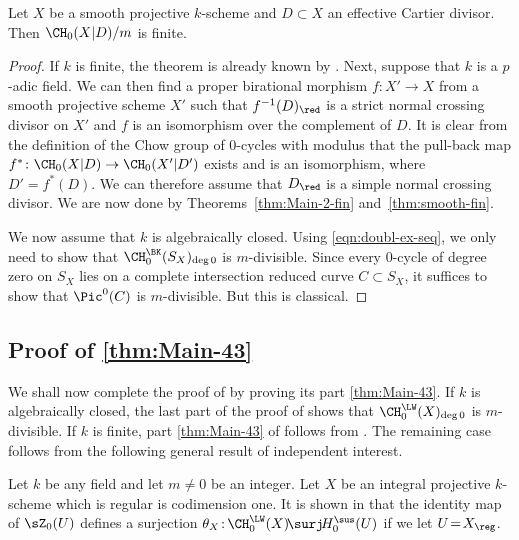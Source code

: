 \begin{thm}\label{thm:Mod-fin}
Let $X$ be a smooth projective $k$-scheme and $D \subset X$ an effective Cartier
divisor. Then ${\CH_0(X|D)}/m$ is finite.
\end{thm}
\begin{proof}
If $k$ is finite, the theorem is already known by \cite[Th.\,1.3 \& 4.8]{GKris}.
Next, suppose that $k$ is a $p$-adic field. We can then
find a proper birational morphism $f \colon X' \to X$ from a smooth
projective scheme $X'$ such that $f^{-1}(D)_\red$ is a strict normal
crossing divisor on $X'$ and $f$ is an isomorphism over the complement of
$D$. It is clear from the definition of the Chow group of $0$-cycles
with modulus that the pull-back map $f^* \colon \CH_0(X|D) \to
\CH_0(X'|D')$ exists and is an isomorphism, where $D' = f^*(D)$.
We can therefore assume that $D_\red$ is a simple normal crossing
divisor. We are now done by Theorems~\ref{thm:Main-2-fin} and~\ref{thm:smooth-fin}.

We now assume that $k$ is algebraically closed. Using \eqref{eqn:doubl-ex-seq},
we only need to show that $\CH^{\BK}_0(S_X)_{\deg 0}$ is
$m$-divisible. Since every $0$-cycle of degree zero on $S_X$ lies on
a complete intersection reduced curve $C \subset S_X$, it suffices to
show that $\Pic^0(C)$ is $m$-divisible. But this is classical.
\end{proof}

\subsection{Proof of \eqref{thm:Main-43}}\label{sec:FLW}
We shall now complete the proof of  by proving its part \eqref{thm:Main-43}.
If $k$ is algebraically closed, the last part of the proof of 
shows that $\CH^{\LW}_0(X)_{\deg 0}$ is $m$-divisible. If $k$ is finite,
part \eqref{thm:Main-43} of  follows from \cite[Th.\,1.3]{GK-1}.
The remaining case follows from the following general result of independent
interest.

Let $k$ be any field and let $m\!\neq\!0$ be an integer.
Let $X$ be an integral \hbox{projective} $k$-scheme which is regular is codimension one.
It is shown in \cite[Lem.\,8.3]{GK-1} that the identity map of
$\sZ_0(U)$ defines a surjection
$\theta_X \colon\!\CH^{\LW}_0(X) \!\surj\! H^{\sus}_0(U)$ if we let \hbox{$U\!=\!X_\reg$}.

